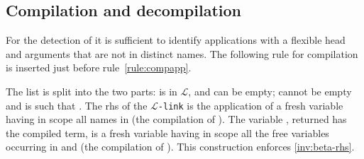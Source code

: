 \documentclass[sigconf,natbib=false,review]{acmart}
\newcommand{\appsep}{\ensuremath{\textcolor{lightgray}{\cdot}}}
\newcommand{\llambda}{\ensuremath{\mathcal{L}}\xspace}
\newcommand{\linkMacro}[1]{\ensuremath{#1}\texttt{-link}\xspace}
\newcommand{\linkbeta}{\linkMacro{\llambda}}
\newcommand{\Fo}{\texorpdfstring{\ensuremath{\mathcal{F}_{\!o}\xspace}}{Fo}} %
\newcommand{\linkbetaM}[3]{\ensuremath{#1 \vdash #2 =_{\llambda} #3}}
\newcommand{\rhs}{rhs\xspace}
\newcommand{\linkStore}{\texorpdfstring{\ensuremath{\mathbb{L}}\xspace}{L}}
\begin{document}

\subsection{Compilation and decompilation}

For the detection of \notllambda it
is sufficient to identify applications with a flexible head and arguments that
are not in distinct names. The following rule for \notllambda compilation
is inserted  just before rule~\ref{rule:compapp}.




\noindent
The list  is split into the two parts: 
 is in \llambda, and can be empty; 
 cannot be empty and is such that
.
The \rhs of the \linkbeta is
the application of a fresh variable  having
in scope all names in  (the compilation of ).
The variable , returned has the compiled term, is a fresh variable
having in scope all the free variables occurring in  and
 (the compilation of ).
This construction enforces \cref{inv:beta-rhs}.



\end{document}
